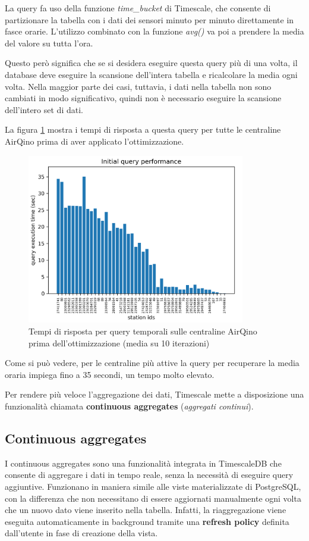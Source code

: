 La query fa uso della funzione \textit{time\_bucket} di Timescale, che consente di partizionare la tabella con i dati dei sensori minuto per minuto direttamente in fasce orarie. L'utilizzo combinato con la funzione \textit{avg()} va poi a prendere la media del valore su tutta l'ora.

Questo però significa che se si desidera eseguire questa query più di una volta, il database deve eseguire la scansione dell'intera tabella e ricalcolare la media ogni volta. Nella maggior parte dei casi, tuttavia, i dati nella tabella non sono cambiati in modo significativo, quindi non è necessario eseguire la scansione dell'intero set di dati.

La figura \ref{fig:query-prima} mostra i tempi di risposta a questa query per tutte le centraline AirQino prima di aver applicato l'ottimizzazione.

\begin{figure}[H]
\centering
\captionsetup{justification=centering}
\includegraphics[width=0.85\textwidth,height=\textheight,keepaspectratio]{img/query_prima}
\caption{Tempi di risposta per query temporali sulle centraline AirQino prima dell'ottimizzazione (media su 10 iterazioni)}
\label{fig:query-prima}
\end{figure}

Come si può vedere, per le centraline più attive la query per recuperare la media oraria impiega fino a 35 secondi, un tempo molto elevato.

Per rendere più veloce l'aggregazione dei dati, Timescale mette a disposizione una funzionalità chiamata \textbf{continuous aggregates} (\textit{aggregati continui}).

\subsection{Continuous aggregates}\label{ssec:cont-aggr}
I continuous aggregates sono una funzionalità integrata in TimescaleDB che consente di aggregare i dati in tempo reale, senza la necessità di eseguire query aggiuntive. Funzionano in maniera simile alle viste materializzate di PostgreSQL, con la differenza che non necessitano di essere aggiornati manualmente ogni volta che un nuovo dato viene inserito nella tabella. Infatti, la riaggregazione viene eseguita automaticamente in background tramite una \textbf{refresh policy} definita dall'utente in fase di creazione della vista.

